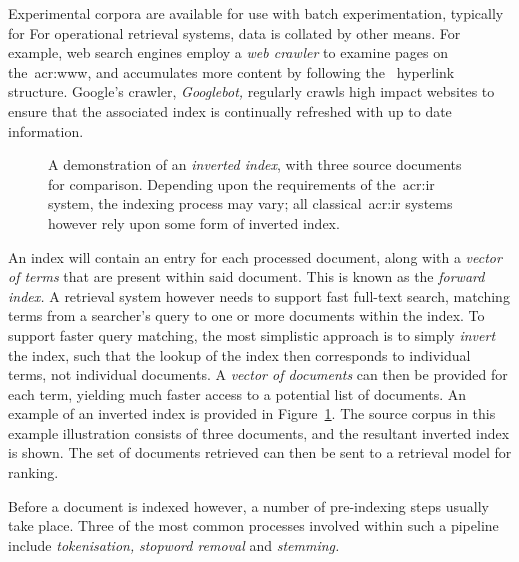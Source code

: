 Experimental corpora are available for use with batch experimentation, typically for  For operational retrieval systems, data is collated by other means. For example, web search engines employ a \emph{web crawler} to examine pages on the~\gls{acr:www}, and accumulates more content by following the~ hyperlink structure. Google's crawler, \emph{Googlebot,} regularly crawls high impact websites to ensure that the associated index is continually refreshed with up to date information.

\begin{figure}[t!]
    \centering
    \caption[Illustration of an \emph{inverted index}]{A demonstration of an \emph{inverted index}, with three source documents for comparison. Depending upon the requirements of the~\gls{acr:ir} system, the indexing process may vary; all classical~\gls{acr:ir} systems however rely upon some form of inverted index.}
    \label{fig:inverted}
\end{figure}

An index will contain an entry for each processed document, along with a \emph{vector of terms} that are present within said document. This is known as the \emph{forward index.} A retrieval system however needs to support fast full-text search, matching terms from a searcher's query to one or more documents within the index. To support faster query matching, the most simplistic approach is to simply \emph{invert} the index, such that the lookup of the index then corresponds to individual terms, not individual documents. A \emph{vector of documents} can then be provided for each term, yielding much faster access to a potential list of documents. An example of an inverted index is provided in Figure~\ref{fig:inverted}. The source corpus in this example illustration consists of three documents, and the resultant inverted index is shown. The set of documents retrieved can then be sent to a retrieval model for ranking.

Before a document is indexed however, a number of pre-indexing steps usually take place. Three of the most common processes involved within such a pipeline include \emph{tokenisation,} \emph{stopword removal} and \emph{stemming.}

